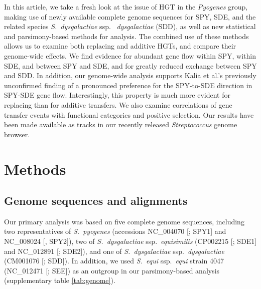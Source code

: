 \documentclass[12pt]{article}
\begin{document}
In this article, we take a fresh look at the issue of HGT in the {\em
  Pyogenes} group, making use of newly available complete genome sequences
for SPY, SDE, and the related species {\em S.\ dysgalactiae} ssp.\ {\em
  dysgalactiae} (SDD), as well as new statistical and parsimony-based
methods for 
analysis.  The combined use of these methods allows us to examine both
replacing and additive HGTs, and compare their genome-wide effects.  We
find evidence for abundant gene flow within SPY, within SDE, and between
SPY and SDE, and for greatly reduced exchange between SPY and SDD.  In
addition, our genome-wide analysis supports Kalia et al.'s
\citeyearpar{Kalia2001} previously unconfirmed finding of a pronounced
preference for the SPY-to-SDE direction in SPY-SDE gene flow.
Interestingly, this property is much more evident for replacing than for
additive transfers.  We also examine correlations of gene transfer
events with functional categories and positive selection.
Our results
have been made available as tracks in our recently released {\em
  Streptococcus} genome browser.

\section*{Methods}

\subsection*{Genome sequences and alignments}

Our primary analysis was based on five complete genome sequences, including
two representatives of {\em S.\ pyogenes} (accessions NC\_004070
[\citealp{Beres2002}; SPY1] and NC\_008024 [\citealp{Beres2006}, SPY2]),
two of {\em S.\ dysgalactiae} ssp.\ {\em equisimilis} (CP002215
[\citealp{Suzuki2011}; SDE1] and NC\_012891 [\citealp{Shimomura2011};
SDE2]), and one of {\em S.\ dysgalactiae} ssp.\ {\em dysgalactiae}
(CM001076 [\citealp{Suzuki2011}; SDD]).  In addition, we used 
\textit{S.\ equi} ssp.\textit{\ equi} strain 4047 (NC\_012471
[\citealp{Holden2009}; SEE]) as an outgroup in our parsimony-based
analysis (supplementary table \ref{tab:genome}).
 
\end{document}
